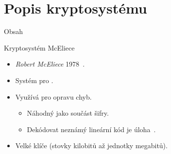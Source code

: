 \documentclass{beamer}
\begin{document}
\section{Popis kryptosystému}
\begin{frame}{Obsah}
    \tableofcontents[currentsection]
\end{frame}

\begin{frame}{Kryptosystém McEliece}
    \begin{itemize}

        \item \emph{Robert McEliece} 1978~\cite{McEliece}.
        \item Systém pro .

            \pause
        \item Využívá  pro opravu chyb.

            \begin{itemize}
                \item Náhodný  jako součást šifry.
                \item Dekódovat neznámý lineární kód je 
                    úloha~\cite{Berlekamp1}.
            \end{itemize}

            \pause
        \item \alert{Velké klíče} (stovky kilobitů až jednotky megabitů).

    \end{itemize}
\end{frame}

\end{document}
